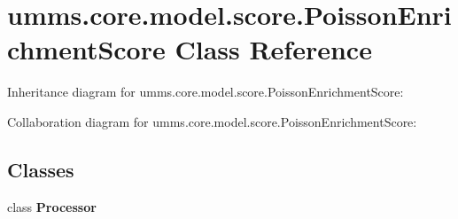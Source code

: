 \hypertarget{classumms_1_1core_1_1model_1_1score_1_1_poisson_enrichment_score}{\section{umms.\+core.\+model.\+score.\+Poisson\+Enrichment\+Score Class Reference}
\label{classumms_1_1core_1_1model_1_1score_1_1_poisson_enrichment_score}
}


Inheritance diagram for umms.\+core.\+model.\+score.\+Poisson\+Enrichment\+Score\+:


Collaboration diagram for umms.\+core.\+model.\+score.\+Poisson\+Enrichment\+Score\+:
\subsection*{Classes}
\begin{DoxyCompactItemize}
\item 
class {\bfseries Processor}
\end{DoxyCompactItemize}
